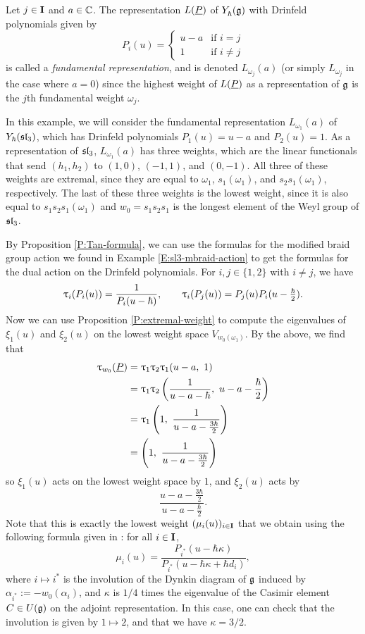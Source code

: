 \begin{example}\label{E:dual-braid-sl3}
    Let $j\in\mathbf{I}$ and $a\in\mathbb{C}$.
    The representation $L(\underline{P})$ of $Y_\hbar^{}(\mathfrak{g})$ with Drinfeld polynomials given by
    \[P_i(u) =
    \begin{cases}
        u-a & \text{if } i=j \\
        1 & \text{if } i\neq j
    \end{cases}\]
    is called a \emph{fundamental representation}, and is denoted $L_{\omega_j}(a)$ (or simply $L_{\omega_j}$ in the case where $a=0$) since the highest weight of $L(\underline{P})$ as a representation of $\mathfrak{g}$ is the $j$th fundamental weight $\omega_j$.

    In this example, we will consider the fundamental representation $L_{\omega_1}(a)$ of $Y_\hbar(\mathfrak{sl}_3)$, which has Drinfeld polynomials $P_1(u) = u-a$ and $P_2(u) = 1$.
    As a representation of $\mathfrak{sl}_3$, $L_{\omega_1}(a)$ has three weights, which are the linear functionals that send $(h_1,h_2)$ to $(1,0)$, $(-1,1)$, and $(0,-1)$.
    All three of these weights are extremal, since they are equal to $\omega_1$, $s_1(\omega_1)$, and $s_2s_1(\omega_1)$, respectively.
    The last of these three weights is the lowest weight, since it is also equal to $s_1s_2s_1(\omega_1)$ and $w_0 = s_1s_2s_1$ is the longest element of the Weyl group of $\mathfrak{sl}_3$.

    By Proposition \ref{P:Tan-formula}, we can use the formulas for the modified braid group action we found in Example \ref{E:sl3-mbraid-action} to get the formulas for the dual action on the Drinfeld polynomials.
    For $i,j\in\{1,2\}$ with $i\neq j$, we have
    \[\uptau_i(P_i(u)) = \frac{1}{P_i(u-\hbar)}, \qquad \uptau_i(P_j(u)) = P_j(u)P_i(u-\tfrac{\hbar}{2}).\]
    Now we can use Proposition \ref{P:extremal-weight} to compute the eigenvalues of $\xi_1(u)$ and $\xi_2(u)$ on the lowest weight space $V_{w_0(\omega_1)}$.
    By the above, we find that
    \begin{align*}
        \braid_{w_0}(\uP) & = \braid_1\braid_2\braid_1(u-a,\ 1) \\
        &= \braid_1\braid_2\left(\frac{1}{u-a-\hbar},\ u-a-\frac{\hbar}{2}\right) \\
        &= \braid_1\left(1,\ \frac{1}{u-a-\frac{3\hbar}{2}}\right) \\
        &= \left(1,\ \frac{1}{u-a-\frac{3\hbar}{2}}\right)
    \end{align*}
    so $\xi_1(u)$ acts on the lowest weight space by $1$, and $\xi_2(u)$ acts by
    \[\frac{u-a-\frac{3\hbar}{2}}{u-a-\frac{\hbar}{2}}.\]
    Note that this is exactly the lowest weight $(\mu_i(u))_{i\in\mathbf{I}}$ that we obtain using the following formula given in \cite[Prop. 3.5]{gautam_poles_2023}: for all $i\in\mathbf{I}$,
    \[\mu_i(u) = \frac{P_{i^*}(u-\hbar\kappa)}{P_{i^*}(u-\hbar\kappa+\hbar d_i)},\]
    where $i\mapsto i^*$ is the involution of the Dynkin diagram of $\mathfrak{g}$ induced by $\alpha_{i^*} := -w_0(\alpha_i)$, and $\kappa$ is $1/4$ times the eigenvalue of the Casimir element $C\in U(\mathfrak{g})$ on the adjoint representation.
    In this case, one can check that the involution is given by $1\mapsto 2$, and that we have $\kappa = 3/2$.
\end{example}
